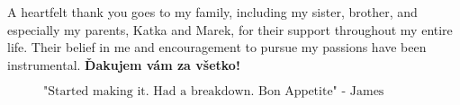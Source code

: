 A heartfelt thank you goes to my family, including my sister, brother, and especially my parents, Katka and Marek, for their support throughout my entire life. Their belief in me and encouragement to pursue my passions have been instrumental. \textbf{Ďakujem vám za všetko!}

\begin{figure}[b]
$$\mbox{"Started making it. Had a breakdown. Bon Appetite" - James Acaster}$$
\end{figure}


